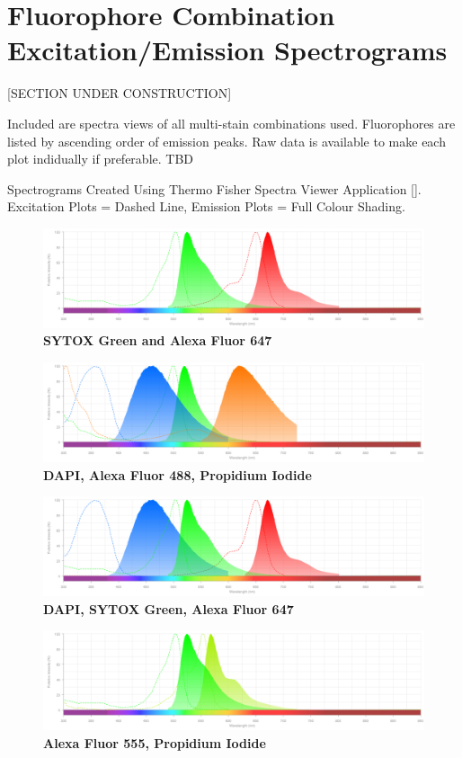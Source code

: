 \chapter{Fluorophore Combination Excitation/Emission Spectrograms}

[SECTION UNDER CONSTRUCTION]

Included are spectra views of all multi-stain combinations used. Fluorophores are listed by ascending order of emission peaks. Raw data is available to make each plot indidually if preferable. TBD

Spectrograms Created Using Thermo Fisher Spectra Viewer Application []. Excitation Plots = Dashed Line, Emission Plots = Full Colour Shading.

\begin{figure}[H]
\centering
\includegraphics[width=1\linewidth]{Images/spectraviewer.png}
\caption{\textbf{SYTOX Green and Alexa Fluor 647}}
\label{spheroids4.2}
\end{figure}

\begin{figure}[H]
\centering
\includegraphics[width=1\linewidth]{Images/spectraviewer (1).png}
\caption{\textbf{DAPI, Alexa Fluor 488, Propidium Iodide}}
\label{spheroids4.2}
\end{figure}

\begin{figure}[H]
\centering
\includegraphics[width=1\linewidth]{Images/spectraviewer (2).png}
\caption{\textbf{DAPI, SYTOX Green, Alexa Fluor 647}}
\label{spheroids4.2}
\end{figure}

\begin{figure}[H]
\centering
\includegraphics[width=1\linewidth]{Images/spectraviewer (3).png}
\caption{\textbf{Alexa Fluor 555, Propidium Iodide}}
\label{spheroids4.2}
\end{figure}

